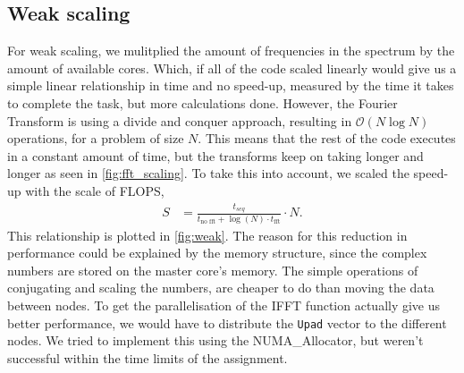 \documentclass{article}
\begin{document}
\subsection{Weak scaling}
For weak scaling, we mulitplied the amount of frequencies in the spectrum by the amount of available cores. Which, if all of the code scaled linearly would give us a simple linear relationship in time and no speed-up, measured by the time it takes to complete the task, but more calculations done. However, the Fourier Transform is using a divide and conquer approach, resulting in $\mathcal{O}(N\log N)$ operations, for a problem of size $N$. This means that the rest of the code executes in a constant amount of time, but the transforms keep on taking longer and longer as seen in \cref{fig:fft_scaling}. To take this into account, we scaled the speed-up with the scale of FLOPS,
\begin{align}
    S &= \frac{t_{seq}}{t_\text{no fft} + \log(N) \cdot t_\text{fft}} \cdot N.
\end{align}
This relationship is plotted in \cref{fig:weak}.
The reason for this reduction in performance could be explained by the memory structure, since the complex numbers are stored on the master core's memory. The simple operations of conjugating and scaling the numbers, are cheaper to do than moving the data between nodes. To get the parallelisation of the IFFT function actually give us better performance, we would have to distribute the \texttt{Upad} vector to the different nodes. We tried to implement this using the NUMA\_Allocator, but weren't successful within the time limits of the assignment.
\end{document}

